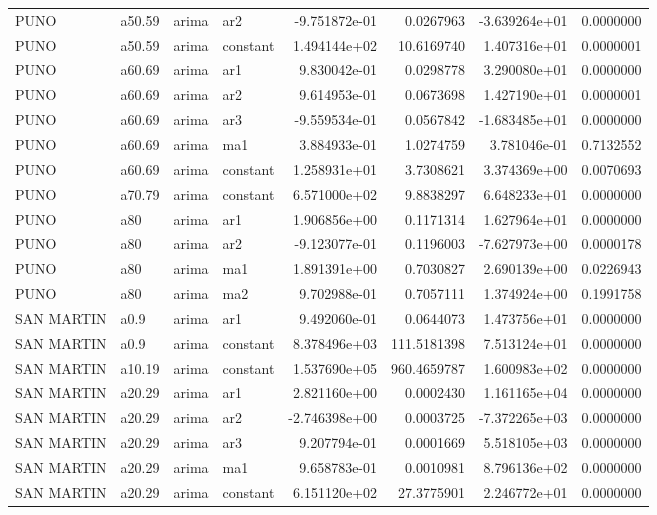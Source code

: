 \documentclass[
]{article}
\begin{document}
\begin{table}[!h]
\begin{tabular}[t]{llllrrrr}
\addlinespace
PUNO & a50.59 & arima & ar2 & -9.751872e-01 & 0.0267963 & -3.639264e+01 & 0.0000000\\
PUNO & a50.59 & arima & constant & 1.494144e+02 & 10.6169740 & 1.407316e+01 & 0.0000001\\
PUNO & a60.69 & arima & ar1 & 9.830042e-01 & 0.0298778 & 3.290080e+01 & 0.0000000\\
PUNO & a60.69 & arima & ar2 & 9.614953e-01 & 0.0673698 & 1.427190e+01 & 0.0000001\\
PUNO & a60.69 & arima & ar3 & -9.559534e-01 & 0.0567842 & -1.683485e+01 & 0.0000000\\
\addlinespace
PUNO & a60.69 & arima & ma1 & 3.884933e-01 & 1.0274759 & 3.781046e-01 & 0.7132552\\
PUNO & a60.69 & arima & constant & 1.258931e+01 & 3.7308621 & 3.374369e+00 & 0.0070693\\
PUNO & a70.79 & arima & constant & 6.571000e+02 & 9.8838297 & 6.648233e+01 & 0.0000000\\
PUNO & a80 & arima & ar1 & 1.906856e+00 & 0.1171314 & 1.627964e+01 & 0.0000000\\
PUNO & a80 & arima & ar2 & -9.123077e-01 & 0.1196003 & -7.627973e+00 & 0.0000178\\
\addlinespace
PUNO & a80 & arima & ma1 & 1.891391e+00 & 0.7030827 & 2.690139e+00 & 0.0226943\\
PUNO & a80 & arima & ma2 & 9.702988e-01 & 0.7057111 & 1.374924e+00 & 0.1991758\\
SAN MARTIN & a0.9 & arima & ar1 & 9.492060e-01 & 0.0644073 & 1.473756e+01 & 0.0000000\\
SAN MARTIN & a0.9 & arima & constant & 8.378496e+03 & 111.5181398 & 7.513124e+01 & 0.0000000\\
SAN MARTIN & a10.19 & arima & constant & 1.537690e+05 & 960.4659787 & 1.600983e+02 & 0.0000000\\
\addlinespace
SAN MARTIN & a20.29 & arima & ar1 & 2.821160e+00 & 0.0002430 & 1.161165e+04 & 0.0000000\\
SAN MARTIN & a20.29 & arima & ar2 & -2.746398e+00 & 0.0003725 & -7.372265e+03 & 0.0000000\\
SAN MARTIN & a20.29 & arima & ar3 & 9.207794e-01 & 0.0001669 & 5.518105e+03 & 0.0000000\\
SAN MARTIN & a20.29 & arima & ma1 & 9.658783e-01 & 0.0010981 & 8.796136e+02 & 0.0000000\\
SAN MARTIN & a20.29 & arima & constant & 6.151120e+02 & 27.3775901 & 2.246772e+01 & 0.0000000\\

\end{tabular}
\end{table}
\end{document}
